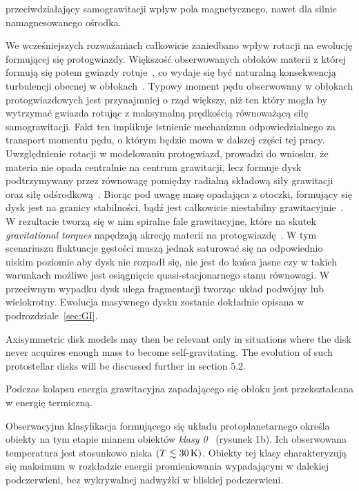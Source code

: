 przeciwdziałający samograwitacji wpływ pola magnetycznego, nawet dla silnie
namagnesowanego ośrodka.
\par We wcześniejszych rozważaniach całkowicie zaniedbano wpływ rotacji na
ewolucję formującej się protogwiazdy. Większość obserwowanych obłoków materii z
której formują się potem gwiazdy rotuje~\cite{GBFM93}, co wydaje się być
naturalną konsekwencją turbulencji obecnej w obłokach~\cite{BB00}. Typowy
moment pędu obserwowany w obłokach protogwiazdowych jest przynajmniej o rząd
większy, niż ten który mogła by wytrzymać gwiazda rotując z maksymalną
prędkością równoważącą siłę samograwitacji. Fakt ten implikuje istnienie
mechanizmu odpowiedzialnego za transport momentu pędu, o którym będzie mowa w
dalszej części tej pracy. Uwzględnienie rotacji w modelowaniu protogwiazd,
prowadzi do wniosku, że materia nie opada centralnie na centrum grawitacji, lecz
formuje dysk podtrzymywany przez równowagę pomiędzy radialną składową siły
grawitacji oraz siłę odśrodkową~\cite{TSC84}. Biorąc pod uwagę
masę opadająca z otoczki, formujący się dysk jest na granicy stabilności, bądź
jest całkowicie niestabilny grawitacyjnie~\cite{SKBT94}. W rezultacie tworzą
się w nim spiralne fale grawitacyjne, które na skutek \emph{gravitational
torques} napędzają akrecję materii na protogwiazdę~\cite{St00}. W tym
scenariuszu fluktuacje gęstości muszą jednak saturować się na odpowiednio niskim
poziomie aby dysk nie rozpadł się, nie jest do końca jasne czy w takich
warunkach możliwe jest osiągnięcie quasi-stacjonarnego stanu równowagi. W
przeciwnym wypadku dysk ulega fragmentacji tworząc układ podwójny lub
wielokrotny. Ewolucja masywnego dysku zostanie dokładnie opisana w
podrozdziale~\ref{sec:GI}. 

Axisymmetric disk models may then be relevant only in situations where the disk
never acquires enough mass to become self-gravitating. The evolution of such
protostellar disks will be discussed further in section 5.2.

Podczas kolapsu energia grawitacyjna zapadającego się obłoku jest przekształcana
w energię termiczną.

Obserwacyjna klasyfikacja formującego się układu
protoplanetarnego określa obiekty na tym etapie mianem obiektów \emph{klasy
0}~\cite{andre} (rysunek 1b).  Ich obserwowana temperatura jest stosunkowo niska
$(T \lesssim 30\hbox{$\thinspace\textrm{K}$})$. Obiekty tej klasy charakteryzują się maksimum w rozkładzie
energii promieniowania wypadającym w dalekiej podczerwieni, bez wykrywalnej
nadwyżki w bliskiej podczerwieni. 

